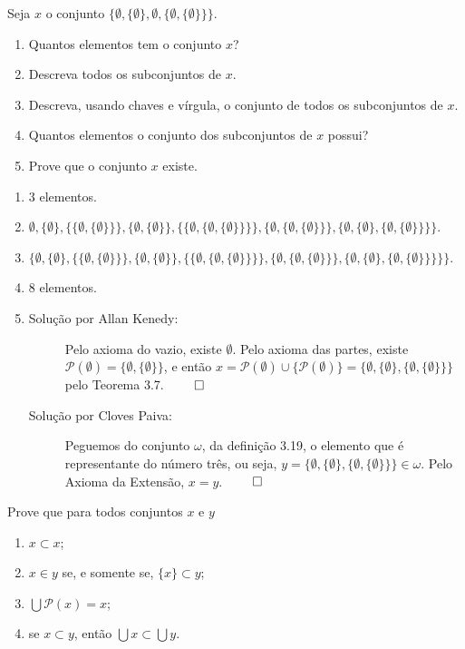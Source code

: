 \begin{exercicio}
	Seja $x$ o conjunto $\{\emptyset,\{\emptyset\},\emptyset,\{\emptyset,\{\emptyset\}\}\}$.
	\begin{enumerate}[label=(\alph{*})]
		\item Quantos elementos tem o conjunto $x$?
		\item Descreva todos os subconjuntos de $x$.
		\item Descreva, usando chaves e vírgula, o conjunto de todos os subconjuntos de $x$.
		\item Quantos elementos o conjunto dos subconjuntos de $x$ possui?
		\item Prove que o conjunto $x$ existe.
	\end{enumerate}
\end{exercicio}

\begin{enumerate}[label=(\alph{*})]
	\item 3 elementos.
	\item $\emptyset,\{\emptyset\},\{\{\emptyset,\{\emptyset\}\}\},\{\emptyset,\{\emptyset\}\},\{\{\emptyset,\{\emptyset,\{\emptyset\}\}\}\},\{\emptyset,\{\emptyset,\{\emptyset\}\}\},\{\emptyset,\{\emptyset\},\{\emptyset,\{\emptyset\}\}\}\}$.
	\item $\{\emptyset,\{\emptyset\},\{\{\emptyset,\{\emptyset\}\}\},\{\emptyset,\{\emptyset\}\},\{\{\emptyset,\{\emptyset,\{\emptyset\}\}\}\},\{\emptyset,\{\emptyset,\{\emptyset\}\}\},\{\emptyset,\{\emptyset\},\{\emptyset,\{\emptyset\}\}\}\}\}$.
	\item 8 elementos.
	\item 
	\begin{description}
		\item[Solução por Allan Kenedy:] Pelo axioma do vazio, existe $\emptyset$. Pelo axioma das partes, existe $\mathcal{P}(\emptyset)=\{\emptyset,\{\emptyset\}\}$, e então $x=\mathcal{P}(\emptyset)\cup\{\mathcal{P}(\emptyset)\}=\{\emptyset,\{\emptyset\},\{\emptyset,\{\emptyset\}\}\}$ pelo Teorema 3.7. $\qed$
		\item[Solução por Cloves Paiva:] Peguemos do conjunto $\omega$, da definição 3.19, o elemento que é representante do número três, ou seja, $y = \{\emptyset, \{\emptyset\}, \{\emptyset, \{\emptyset\}\}\} \in \omega$. Pelo Axioma da Extensão, $x = y$. $\qed$ 
	\end{description}
\end{enumerate}

\begin{exercicio}
	Prove que para todos conjuntos $x$ e $y$
	\begin{enumerate}[label=(\alph{*})]
		\item $x\subset x$;
		\item $x\in y$ se, e somente se, $\{x\}\subset y$;
		\item $\bigcup\mathcal{P}(x)=x$;
		\item se $x\subset y$, então $\bigcup x\subset \bigcup y$.
	\end{enumerate}
\end{exercicio}

